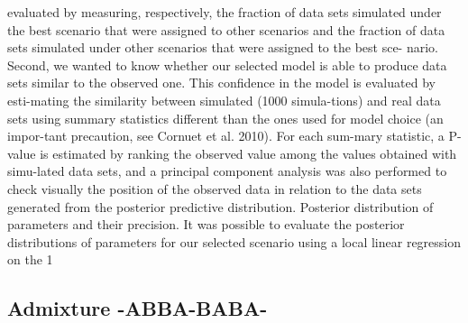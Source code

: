 evaluated by measuring, respectively, the fraction of data sets simulated under the best scenario that were assigned to other scenarios and the fraction of data sets simulated under other scenarios that were assigned to the best sce- nario. Second, we wanted to know whether our selected model is able to produce data sets similar to the observed one. This confidence in the model is evaluated by esti-mating the similarity between simulated (1000 simula-tions) and real data sets using summary statistics different than the ones used for model choice (an impor-tant precaution, see Cornuet et al. 2010). For each sum-mary statistic, a P-value is estimated by ranking the observed value among the values obtained with simu-lated data sets, and a principal component analysis was also performed to check visually the position of the observed data in relation to the data sets generated from the posterior predictive distribution. Posterior distribution of parameters and their precision. It was possible to evaluate the posterior distributions of parameters for our selected scenario using a local linear regression on the 1%

\subsection{Admixture -ABBA-BABA-}

